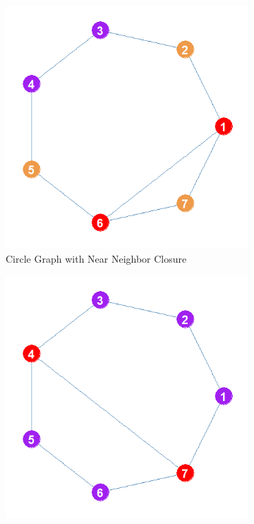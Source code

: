 \documentclass[12pt]{article}
\begin{document}
\begin{figure}
    \captionsetup[subfigure]{font=footnotesize,labelfont=footnotesize}
    \centering

    \begin{subfigure}[b]{0.3\textwidth}
        \includegraphics[width=1.0\textwidth]{Plots/Toys/circle-plus-triangle.png}
            \caption{Circle Graph with Near Neighbor Closure}
            \label{fig:circleplus}
    \end{subfigure}
    \begin{subfigure}[b]{0.3\textwidth}
        \includegraphics[width=1.0\textwidth]{Plots/Toys/circle-plus-long.png}

\end{subfigure}
\end{figure}
\end{document}
